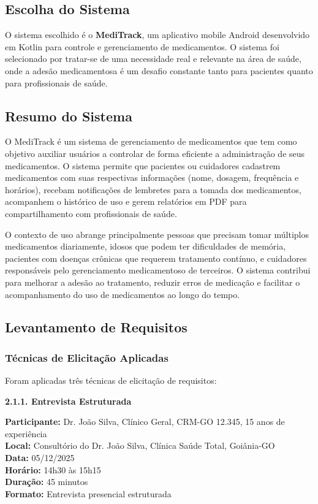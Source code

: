 \documentclass[12pt]{article}
\begin{document}
\subsection{Escolha do Sistema}

O sistema escolhido é o \textbf{MediTrack}, um aplicativo mobile Android desenvolvido em Kotlin para controle e gerenciamento de medicamentos. O sistema foi selecionado por tratar-se de uma necessidade real e relevante na área de saúde, onde a adesão medicamentosa é um desafio constante tanto para pacientes quanto para profissionais de saúde.

\subsection{Resumo do Sistema}

O MediTrack é um sistema de gerenciamento de medicamentos que tem como objetivo auxiliar usuários a controlar de forma eficiente a administração de seus medicamentos. O sistema permite que pacientes ou cuidadores cadastrem medicamentos com suas respectivas informações (nome, dosagem, frequência e horários), recebam notificações de lembretes para a tomada dos medicamentos, acompanhem o histórico de uso e gerem relatórios em PDF para compartilhamento com profissionais de saúde.

O contexto de uso abrange principalmente pessoas que precisam tomar múltiplos medicamentos diariamente, idosos que podem ter dificuldades de memória, pacientes com doenças crônicas que requerem tratamento contínuo, e cuidadores responsáveis pelo gerenciamento medicamentoso de terceiros. O sistema contribui para melhorar a adesão ao tratamento, reduzir erros de medicação e facilitar o acompanhamento do uso de medicamentos ao longo do tempo.

\subsection{Levantamento de Requisitos}

\subsubsection{Técnicas de Elicitação Aplicadas}

Foram aplicadas três técnicas de elicitação de requisitos:

\textbf{2.1.1. Entrevista Estruturada}

\textbf{Participante:} Dr. João Silva, Clínico Geral, CRM-GO 12.345, 15 anos de experiência \\
\textbf{Local:} Consultório do Dr. João Silva, Clínica Saúde Total, Goiânia-GO \\
\textbf{Data:} 05/12/2025 \\
\textbf{Horário:} 14h30 às 15h15 \\
\textbf{Duração:} 45 minutos \\
\textbf{Formato:} Entrevista presencial estruturada
\end{document}
